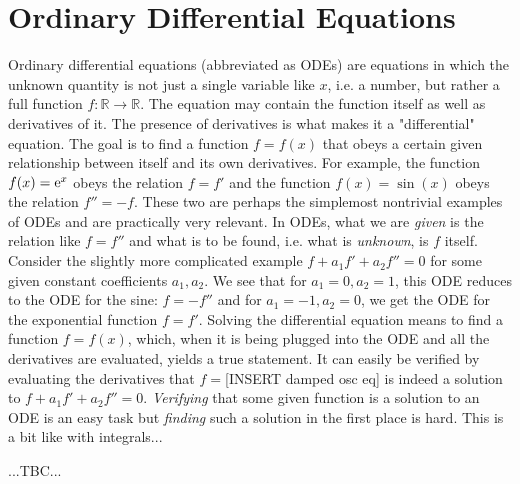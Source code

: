 \section{Ordinary Differential Equations} 
Ordinary differential equations (abbreviated as ODEs) are equations in which the unknown quantity is not just a single variable like $x$, i.e. a number, but rather a full function $f:\mathbb{R} \rightarrow \mathbb{R}$. The equation may contain the function itself as well as derivatives of it. The presence of derivatives is what makes it a "differential" equation. The goal is to find a function $f = f(x)$ that obeys a certain given relationship between itself and its own derivatives. For example, the function $f(x) = \operatorname{\mathrm{e}}^x$ obeys the relation $f = f'$ and the function $f(x) = \sin (x)$ obeys the relation $f'' = -f$. These two are perhaps the simplemost nontrivial examples of ODEs and are practically very relevant. In ODEs, what we are \emph{given} is the relation like $f = f''$ and what is to be found, i.e. what is \emph{unknown}, is $f$ itself. Consider the slightly more complicated example $f + a_1 f' + a_2 f'' = 0$ for some given constant coefficients $a_1, a_2$. We see that for $a_1 = 0, a_2 = 1$, this ODE reduces to the ODE for the sine: $f = -f''$ and for $a_1 = -1, a_2 = 0$, we get the ODE for the exponential function $f = f'$. Solving the differential equation means to find a function $f = f(x)$, which, when it is being plugged into the ODE and all the derivatives are evaluated, yields a true statement. It can easily be verified by evaluating the derivatives that $f = $[INSERT damped osc eq] is indeed a solution to $f + a_1 f' + a_2 f'' = 0$. \emph{Verifying} that some given function is a solution to an ODE is an easy task but \emph{finding} such a solution in the first place is hard. This is a bit like with integrals...

...TBC...




\begin{comment}
-solving an ODE can be seen as a certain generalization of solving an integral - explain how
-give ODE of damped oscillator: f + a_1 f' + a_2 f'' = 0. For $a_1 = 0, a_2 = 1$ we get the ODE for exp, for $a_1 = -1, a_2 = 0$ we get the ODE for sin.

\end{comment}